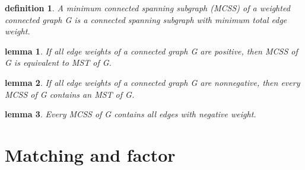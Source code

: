 \documentclass[twocolumn][2pt]{article}
\newtheorem{definition}{definition}
\newtheorem{lemma}{lemma}
\begin{document}
\begin{CJK*}{UTF8}{bkai}
    \begin{definition}
         A minimum connected spanning subgraph (MCSS) of a weighted connected
 graph G is a connected spanning subgraph with minimum total edge weight.
    \end{definition}

    \begin{lemma}
        If all edge weights of a connected graph G are positive, then MCSS of G is
 equivalent to MST of G.
    \end{lemma}

    \begin{lemma}
        If all edge weights of a connected graph G are nonnegative, then every MCSS
 of G contains an MST of G.
    \end{lemma}

    \begin{lemma}
         Every MCSS of G contains all edges with negative weight.
    \end{lemma}


\section*{Matching and factor}


\end{CJK*}
\end{document}
